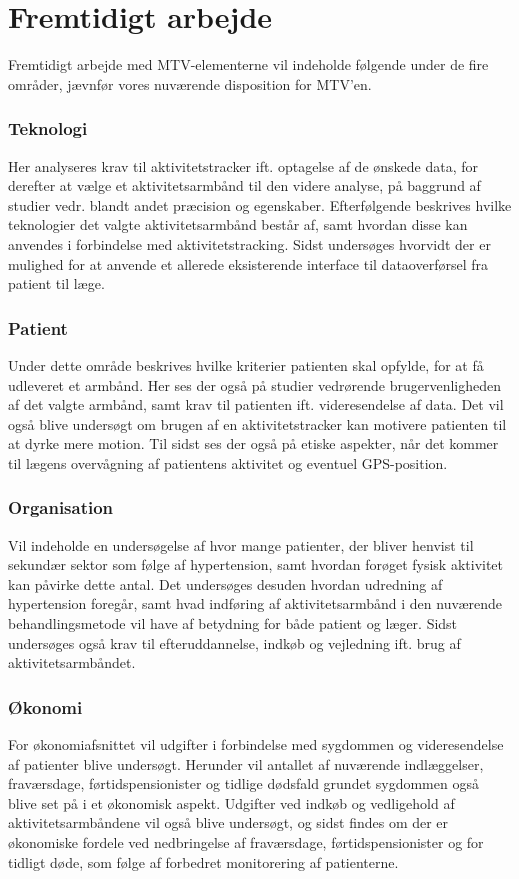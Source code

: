 \section{Fremtidigt arbejde}

Fremtidigt arbejde med MTV-elementerne vil indeholde følgende under de fire områder, jævnfør vores nuværende disposition for MTV'en.

\subsubsection{Teknologi}
Her analyseres krav til aktivitetstracker ift. optagelse af de ønskede data, for derefter at vælge et aktivitetsarmbånd til den videre analyse, på baggrund af studier vedr. blandt andet præcision og egenskaber. Efterfølgende beskrives hvilke teknologier det valgte aktivitetsarmbånd består af, samt hvordan disse kan anvendes i forbindelse med aktivitetstracking. Sidst undersøges hvorvidt der er mulighed for at anvende et allerede eksisterende interface til dataoverførsel fra patient til læge.

\subsubsection{Patient}
Under dette område beskrives hvilke kriterier patienten skal opfylde, for at få udleveret et armbånd. Her ses der også på studier vedrørende brugervenligheden af det valgte armbånd, samt krav til patienten ift. videresendelse af data. Det vil også blive undersøgt om brugen af en aktivitetstracker kan motivere patienten til at dyrke mere motion. Til sidst ses der også på etiske aspekter, når det kommer til lægens overvågning af patientens aktivitet og eventuel GPS-position.

\subsubsection{Organisation}
Vil indeholde en undersøgelse af hvor mange patienter, der bliver henvist til sekundær sektor som følge af hypertension, samt hvordan forøget fysisk aktivitet kan påvirke dette antal. Det undersøges desuden hvordan udredning af hypertension foregår, samt hvad indføring af aktivitetsarmbånd i den nuværende behandlingsmetode vil have af betydning for både patient og læger. Sidst undersøges også krav til efteruddannelse, indkøb og vejledning ift. brug af aktivitetsarmbåndet.

\subsubsection{Økonomi}
For økonomiafsnittet vil udgifter i forbindelse med sygdommen og videresendelse af patienter blive undersøgt. Herunder vil antallet af nuværende indlæggelser, fraværsdage, førtidspensionister og tidlige dødsfald grundet sygdommen også blive set på i et økonomisk aspekt. Udgifter ved indkøb og vedligehold af aktivitetsarmbåndene vil også blive undersøgt, og sidst findes om der er økonomiske fordele ved nedbringelse af fraværsdage, førtidspensionister og for tidligt døde, som følge af forbedret monitorering af patienterne. 